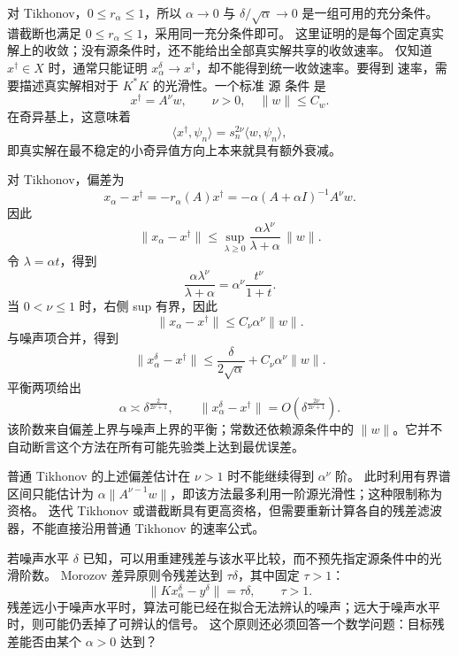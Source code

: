 对 Tikhonov，$0\le r_\alpha\le1$，所以 $\alpha\to0$ 与 $\delta/\sqrt\alpha\to0$ 是一组可用的充分条件。
谱截断也满足 $0\le r_\alpha\le1$，采用同一充分条件即可。
这里证明的是每个固定真实解上的收敛；没有源条件时，还不能给出全部真实解共享的收敛速率。
仅知道 $x^\dagger\in X$ 时，通常只能证明 $x_\alpha^\delta\to x^\dagger$，却不能得到统一收敛速率。要得到 速率，需要描述真实解相对于 $K^*K$ 的光滑性。一个标准 源 条件 是
\[
{
x^\dagger=A^\nu w,
\qquad \nu>0,
\quad \|w\|\le C_w}.
\]
在奇异基上，这意味着
\[
\langle x^\dagger,\psi_n\rangle
=s_n^{2\nu}\langle w,\psi_n\rangle,
\]
即真实解在最不稳定的小奇异值方向上本来就具有额外衰减。

对 Tikhonov，偏差为
\[
x_\alpha-x^\dagger
=-r_\alpha(A)x^\dagger
=-\alpha(A+\alpha I)^{-1}A^\nu w.
\]
因此
\[
\|x_\alpha-x^\dagger\|
\le
\sup_{\lambda\ge0}
\frac{\alpha\lambda^\nu}{\lambda+\alpha}\,\|w\|.
\]
令 $\lambda=\alpha t$，得到
\[
\frac{\alpha\lambda^\nu}{\lambda+\alpha}
=
\alpha^\nu\frac{t^\nu}{1+t}.
\]
当 $0<\nu\le1$ 时，右侧 sup 有界，因此
\[
{
\|x_\alpha-x^\dagger\|
\le C_\nu\alpha^\nu\|w\|
}.
\]
与噪声项合并，得到
\[
\|x_\alpha^\delta-x^\dagger\|
\le
\frac{\delta}{2\sqrt\alpha}
+C_\nu\alpha^\nu\|w\|.
\]
平衡两项给出
\[
\alpha\asymp\delta^{\frac{2}{2\nu+1}},
\qquad
{
\|x_\alpha^\delta-x^\dagger\|
=O\!\left(
\delta^{\frac{2\nu}{2\nu+1}}
\right)}.
\]
该阶数来自偏差上界与噪声上界的平衡；常数还依赖源条件中的 $\|w\|$。它并不自动断言这个方法在所有可能先验类上达到最优误差。

普通 Tikhonov 的上述偏差估计在 $\nu>1$ 时不能继续得到 $\alpha^\nu$ 阶。
此时利用有界谱区间只能估计为 $\alpha\|A^{\nu-1}w\|$，即该方法最多利用一阶源光滑性；这种限制称为资格。
迭代 Tikhonov 或谱截断具有更高资格，但需要重新计算各自的残差滤波器，不能直接沿用普通 Tikhonov 的速率公式。

若噪声水平 $\delta$ 已知，可以用重建残差与该水平比较，而不预先指定源条件中的光滑阶数。
Morozov 差异原则令残差达到 $\tau\delta$，其中固定 $\tau>1$：
\[
{
\|Kx_\alpha^\delta-y^\delta\|
=\tau\delta,
\qquad \tau>1
}.
\]
残差远小于噪声水平时，算法可能已经在拟合无法辨认的噪声；远大于噪声水平时，则可能仍丢掉了可辨认的信号。
这个原则还必须回答一个数学问题：目标残差能否由某个 $\alpha>0$ 达到？

